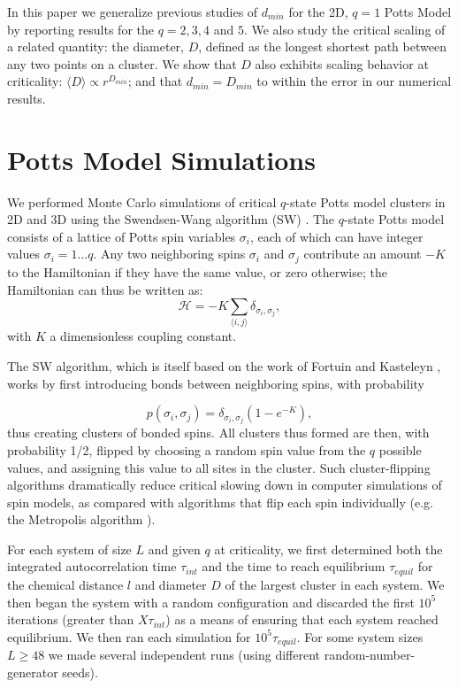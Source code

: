 \documentclass[pre,preprint]{revtex4}
\newcommand{\lb}{{\langle}}
\newcommand{\rb}{{\rangle}}
\begin{document}
In this paper we generalize previous studies of $d_{min}$ for the 2D, $q=1$ Potts Model by reporting results for the $q = 2, 3, 4$ and $5$.  We also study the critical scaling of a related quantity: the diameter, $D$, defined as the longest shortest path between any two points on a cluster.
We show that $D$ also exhibits scaling behavior at criticality: $\langle D \rangle \propto r^{D_{min}}$; and that $d_{min} = D_{min}$ to within the error in our numerical results. 

\section{Potts Model Simulations}

We performed Monte Carlo simulations of critical $q$-state Potts model clusters in 2D and 3D using the Swendsen-Wang algorithm (SW) \cite{SwWa86, NeBa99}.  The $q$-state Potts model consists of a lattice of Potts spin variables $\sigma_i$, each of which can have integer values $\sigma_i = 1 \dots q$.  Any two neighboring spins $\sigma_i$ and $\sigma_j$ contribute an amount $-K$ to the Hamiltonian if they have the same value, or zero otherwise; the Hamiltonian can thus be written as:
\begin{equation}
\mathcal{H} = -K \sum_{\lb i,j \rb} \delta_{\sigma_i, \sigma_j},
\end{equation}     
with $K$ a dimensionless coupling constant.

The SW algorithm, which is itself based on the work of Fortuin and Kasteleyn \cite{FoKa}, works by first introducing bonds between neighboring spins, with probability 

\begin{equation}
p(\sigma_i,\sigma_j) = \delta_{\sigma_i, \sigma_j} (1-e^{-K}),
\end{equation}  
thus creating clusters of bonded spins.   All clusters thus formed are then, with probability 1/2, flipped by choosing a random spin value from the $q$ possible values, and assigning this value to all sites in the cluster.  Such cluster-flipping algorithms dramatically reduce critical slowing down in computer simulations of spin models, as compared with algorithms that flip each spin individually \cite{NeBa99} (e.g. the Metropolis algorithm \cite{Met}). 

For each system of size $L$ and given $q$ at criticality, we first determined both the integrated autocorrelation time $\tau_{int}$ and the time to reach equilibrium $\tau_{equil}$ for the chemical distance $l$ and diameter $D$ of the largest cluster in each system. We then began the system with a random configuration and discarded the first $10^5$ iterations (greater than $X \tau_{int}$) as a means of ensuring that each system reached equilibrium.  We then ran each simulation for $10^5 \tau_{equil}$.  For some system sizes $L \ge 48$ we made several independent runs (using different random-number-generator seeds).  
\end{document}
